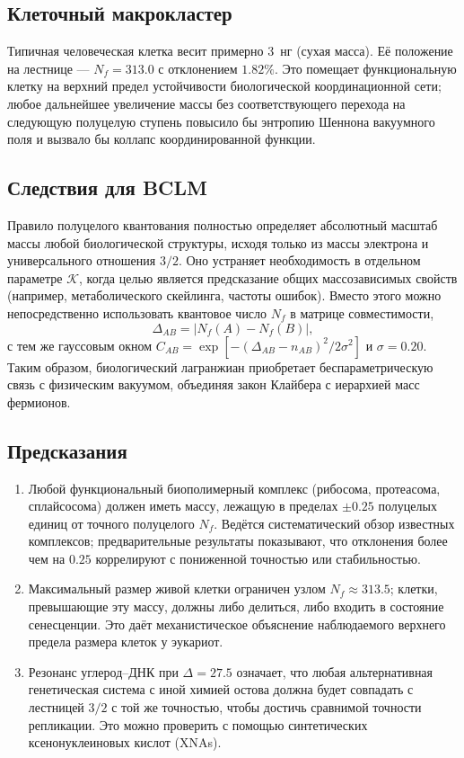 \documentclass[12pt,a4paper]{article}
\newcommand{\REL}{\mathcal{K}}          %
\begin{document}
	\subsection{Клеточный макрокластер}
	Типичная человеческая клетка весит примерно 3~нг (сухая масса). Её положение на лестнице — \(N_f = 313.0\) с отклонением \(1.82\%\). Это помещает функциональную клетку на верхний предел устойчивости биологической координационной сети; любое дальнейшее увеличение массы без соответствующего перехода на следующую полуцелую ступень повысило бы энтропию Шеннона вакуумного поля и вызвало бы коллапс координированной функции.
	
	\subsection{Следствия для BCLM}
	Правило полуцелого квантования полностью определяет абсолютный масштаб массы любой биологической структуры, исходя только из массы электрона и универсального отношения \(3/2\). Оно устраняет необходимость в отдельном параметре \(\REL\), когда целью является предсказание общих массозависимых свойств (например, метаболического скейлинга, частоты ошибок). Вместо этого можно непосредственно использовать квантовое число \(N_f\) в матрице совместимости,
	\[
	\Delta_{AB} = |N_f(A) - N_f(B)|,
	\]
	с тем же гауссовым окном \(C_{AB} = \exp[-(\Delta_{AB} - n_{AB})^2/2\sigma^2]\) и \(\sigma=0.20\). Таким образом, биологический лагранжиан приобретает беспараметрическую связь с физическим вакуумом, объединяя закон Клайбера с иерархией масс фермионов.
	
	\subsection{Предсказания}
	\begin{enumerate}
		\item Любой функциональный биополимерный комплекс (рибосома, протеасома, сплайсосома) должен иметь массу, лежащую в пределах \(\pm 0.25\) полуцелых единиц от точного полуцелого \(N_f\). Ведётся систематический обзор известных комплексов; предварительные результаты показывают, что отклонения более чем на \(0.25\) коррелируют с пониженной точностью или стабильностью.
		\item Максимальный размер живой клетки ограничен узлом \(N_f \approx 313.5\); клетки, превышающие эту массу, должны либо делиться, либо входить в состояние сенесценции. Это даёт механистическое объяснение наблюдаемого верхнего предела размера клеток у эукариот.
		\item Резонанс углерод–ДНК при \(\Delta = 27.5\) означает, что любая альтернативная генетическая система с иной химией остова должна будет совпадать с лестницей \(3/2\) с той же точностью, чтобы достичь сравнимой точности репликации. Это можно проверить с помощью синтетических ксенонуклеиновых кислот (XNAs).
	\end{enumerate}
	
\end{document}
